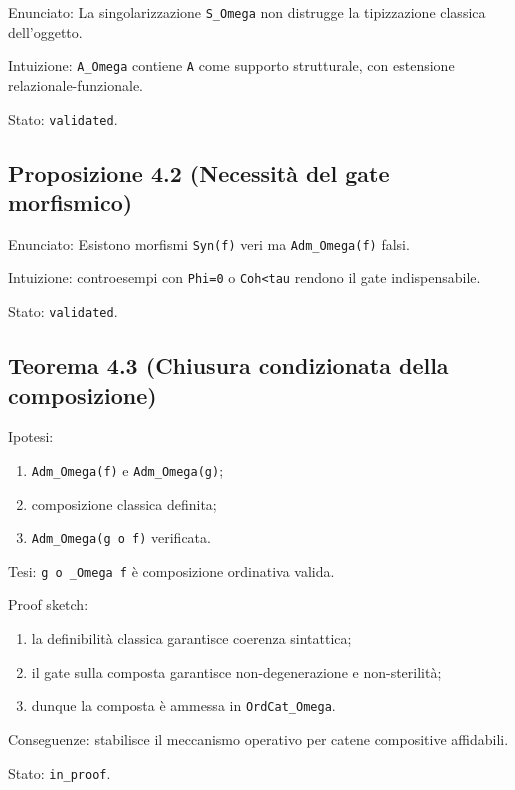 Enunciato:
La singolarizzazione \texttt{S\_Omega} non distrugge la tipizzazione classica dell'oggetto.

Intuizione:
\texttt{A\_Omega} contiene \texttt{A} come supporto strutturale, con estensione relazionale-funzionale.

Stato: \texttt{validated}.

\subsection{Proposizione 4.2 (Necessità del gate morfismico)}

Enunciato:
Esistono morfismi \texttt{Syn(f)} veri ma \texttt{Adm\_Omega(f)} falsi.

Intuizione:
controesempi con \texttt{Phi=0} o \texttt{Coh\textless{}tau} rendono il gate indispensabile.

Stato: \texttt{validated}.

\subsection{Teorema 4.3 (Chiusura condizionata della composizione)}

Ipotesi:

\begin{enumerate}
\def\labelenumi{\arabic{enumi}.}
\tightlist
\item
  \texttt{Adm\_Omega(f)} e \texttt{Adm\_Omega(g)};
\item
  composizione classica definita;
\item
  \texttt{Adm\_Omega(g\ o\ f)} verificata.
\end{enumerate}

Tesi:
\texttt{g\ o\ \_Omega\ f} è composizione ordinativa valida.

Proof sketch:

\begin{enumerate}
\def\labelenumi{\arabic{enumi}.}
\tightlist
\item
  la definibilità classica garantisce coerenza sintattica;
\item
  il gate sulla composta garantisce non-degenerazione e non-sterilità;
\item
  dunque la composta è ammessa in \texttt{OrdCat\_Omega}.
\end{enumerate}

Conseguenze:
stabilisce il meccanismo operativo per catene compositive affidabili.

Stato: \texttt{in\_proof}.

